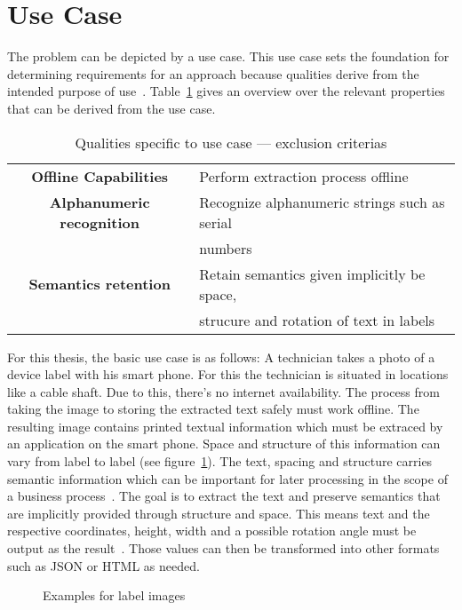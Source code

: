 \section{Use Case}
The problem can be depicted by a use case.
This use case sets the foundation for determining requirements for an
approach because qualities derive from the intended purpose of
use~\citep{siebert_construction_2021}.
Table~\ref{tb:useCaseQualities} gives an overview over the relevant properties that can be derived
from the use case.
\begin{table}[ht]
    \centering\scriptsize
    \begin{tabular}{c l}
        \textbf{Offline Capabilities} & Perform extraction process offline \\
        \textbf{Alphanumeric recognition}    & Recognize alphanumeric strings such as serial \\
                                    & numbers \\
        \textbf{Semantics retention} & Retain semantics given implicitly be space, \\
                            & strucure and rotation of text in labels \\
    \end{tabular}
    \caption{Qualities specific to use case --- exclusion criterias\label{tb:useCaseQualities}}
\end{table}
For this thesis, the basic use case is as follows:
A technician takes a photo of a device label with his smart phone.
For this the technician is situated in locations like a cable shaft.
Due to this, there's no internet availability.
The process from taking the image to storing the extracted text safely must work offline.
The resulting image contains printed textual information which must be extraced by an application on
the smart phone.
Space and structure of this information can vary from label to label (see figure~\ref{fig:examples}).
The text, spacing and structure carries semantic information which can be important for later
processing in the scope of a business process~\citep{chen_text_2021}.
The goal is to extract the text and preserve semantics that are implicitly provided through
structure and space.
This means text and the respective coordinates, height, width and a possible rotation angle must
be output as the result~\citep{yang_learning_2021}.
Those values can then be transformed into other formats such as JSON or HTML as needed.
\begin{figure}[h]
    \centering
    \caption{Examples for label images\label{fig:examples}}
\end{figure}
